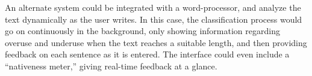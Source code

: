 \documentclass[main.tex]{subfiles}
\begin{document}
An alternate system could be integrated with a word-processor, and analyze the text dynamically as the user writes. In this case, the classification process would go on continuously in the background, only showing information regarding overuse and underuse when the text reaches a suitable length, and then providing feedback on each sentence as it is entered. The interface could even include a ``nativeness meter,'' giving real-time feedback at a glance.

\biblio
\end{document}
